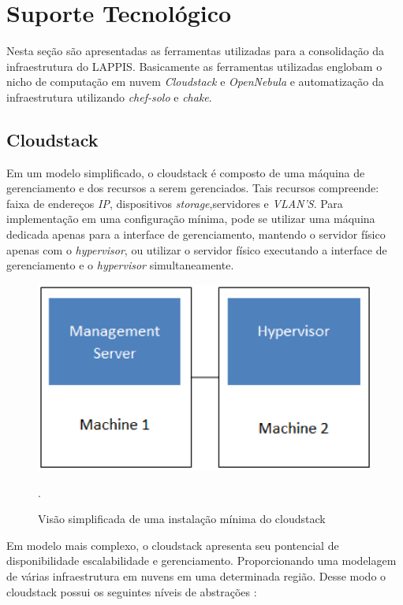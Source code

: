 \chapter{Suporte Tecnológico}

Nesta seção são apresentadas as ferramentas utilizadas para a consolidação da infraestrutura do LAPPIS. Basicamente as ferramentas utilizadas englobam o nicho de computação em nuvem \textit{Cloudstack} e \textit{OpenNebula} e automatização da infraestrutura utilizando \textit{chef-solo} e \textit{chake}.
\section{Cloudstack}
Em um modelo simplificado, o cloudstack é composto de uma máquina de gerenciamento e dos recursos a serem gerenciados. Tais recursos compreende: faixa de endereços \textit{IP}, dispositivos \textit{storage},servidores e \textit{VLAN'S}. Para implementação em uma configuração mínima, pode se utilizar uma máquina dedicada apenas para a interface de gerenciamento, mantendo o servidor físico apenas com o \textit{hypervisor}, ou utilizar o servidor físico executando a interface de gerenciamento e o \textit{hypervisor} simultaneamente. 

\begin{figure}[!htb]
\centering
\includegraphics [keepaspectratio=true,scale=0.60]{figuras/cloudstack_minimal.eps}
\caption{Visão simplificada de uma instalação mínima do cloudstack}
\cite{cloudstack}.
\label{cloudstatck_minimal}
\end{figure}

Em modelo mais complexo, o cloudstack apresenta seu pontencial de disponibilidade escalabilidade e gerenciamento. Proporcionando uma modelagem de várias
infraestrutura em nuvens em uma determinada região. Desse modo o cloudstack possui os seguintes níveis de abstrações \cite{shape}:

